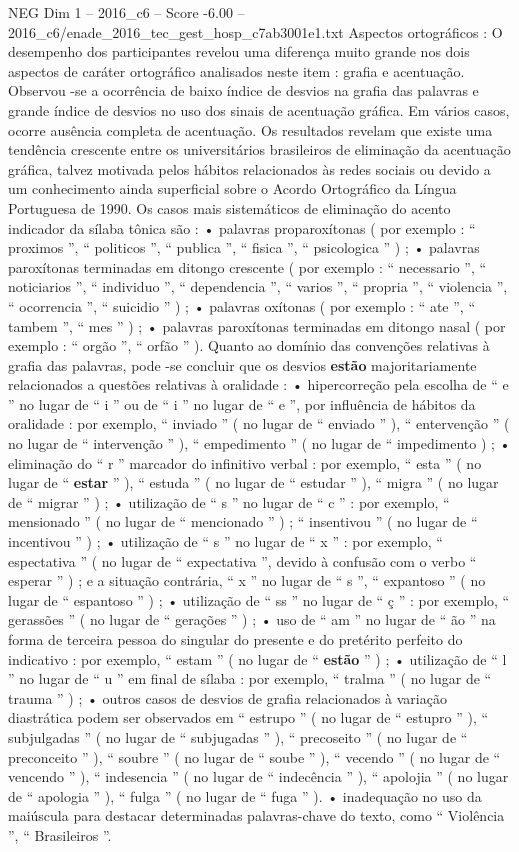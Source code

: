 \begin{textsample}{NEG Dim 1 – 2016\_c6 – Score -6.00 – 2016\_c6/enade\_2016\_tec\_gest\_hosp\_c7ab3001e1.txt}
Aspectos ortográficos : O desempenho dos participantes revelou uma diferença muito grande nos dois aspectos de caráter ortográfico analisados neste item : grafia e acentuação.
Observou -se a ocorrência de baixo índice de desvios na grafia das palavras e grande índice de desvios no uso dos sinais de acentuação gráfica.
Em vários casos, ocorre ausência completa de acentuação.
Os resultados revelam que existe uma tendência crescente entre os universitários brasileiros de eliminação da acentuação gráfica, talvez motivada pelos hábitos relacionados às redes sociais ou devido a um conhecimento ainda superficial sobre o Acordo Ortográfico da Língua Portuguesa de 1990.
Os casos mais sistemáticos de eliminação do acento indicador da sílaba tônica são : • palavras proparoxítonas ( por exemplo : “ proximos ”, “ politicos ”, “ publica ”, “ fisica ”, “ psicologica ” ) ; • palavras paroxítonas terminadas em ditongo crescente ( por exemplo : “ necessario ”, “ noticiarios ”, “ individuo ”, “ dependencia ”, “ varios ”, “ propria ”, “ violencia ”, “ ocorrencia ”, “ suicidio ” ) ; • palavras oxítonas ( por exemplo : “ ate ”, “ tambem ”, “ mes ” ) ; • palavras paroxítonas terminadas em ditongo nasal ( por exemplo : “ orgão ”, “ orfão ” ).
Quanto ao domínio das convenções relativas à grafia das palavras, pode -se concluir que os desvios \textbf{estão} majoritariamente relacionados a questões relativas à oralidade : • hipercorreção pela escolha de “ e ” no lugar de “ i ” ou de “ i ” no lugar de “ e ”, por influência de hábitos da oralidade : por exemplo, “ inviado ” ( no lugar de “ enviado ” ), “ entervenção ” ( no lugar de “ intervenção ” ), “ empedimento ” ( no lugar de “ impedimento ) ; • eliminação do “ r ” marcador do infinitivo verbal : por exemplo, “ esta ” ( no lugar de “ \textbf{estar} ” ), “ estuda ” ( no lugar de “ estudar ” ), “ migra ” ( no lugar de “ migrar ” ) ; • utilização de “ s ” no lugar de “ c ” : por exemplo, “ mensionado ” ( no lugar de “ mencionado ” ) ; “ insentivou ” ( no lugar de “ incentivou ” ) ; • utilização de “ s ” no lugar de “ x ” : por exemplo, “ espectativa ” ( no lugar de “ expectativa ”, devido à confusão com o verbo “ esperar ” ) ; e a situação contrária, “ x ” no lugar de “ s ”, “ expantoso ” ( no lugar de “ espantoso ” ) ; • utilização de “ ss ” no lugar de “ ç ” : por exemplo, “ gerassões ” ( no lugar de “ gerações ” ) ; • uso de “ am ” no lugar de “ ão ” na forma de terceira pessoa do singular do presente e do pretérito perfeito do indicativo : por exemplo, “ estam ” ( no lugar de “ \textbf{estão} ” ) ; • utilização de “ l ” no lugar de “ u ” em final de sílaba : por exemplo, “ tralma ” ( no lugar de “ trauma ” ) ; • outros casos de desvios de grafia relacionados à variação diastrática podem ser observados em “ estrupo ” ( no lugar de “ estupro ” ), “ subjulgadas ” ( no lugar de “ subjugadas ” ), “ precoseito ” ( no lugar de “ preconceito ” ), “ soubre ” ( no lugar de “ soube ” ), “ vecendo ” ( no lugar de “ vencendo ” ), “ indesencia ” ( no lugar de “ indecência ” ), “ apolojia ” ( no lugar de “ apologia ” ), “ fulga ” ( no lugar de “ fuga ” ). • inadequação no uso da maiúscula para destacar determinadas palavras-chave do texto, como “ Violência ”, “ Brasileiros ”.

\end{textsample}
